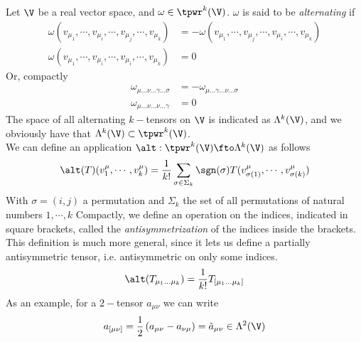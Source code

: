 \documentclass[../mmf.tex]{subfiles}
\begin{document}
\begin{dfn}
	Let $\V$ be a real vector space, and $\omega\in\tpwr^k(\V)$. $\omega$ is said to be \textit{alternating} if
	\begin{equation}
		\begin{aligned}
			\omega(v_{\mu_1},\cdots,v_{\mu_i},\cdots,v_{\mu_j},\cdots,v_{\mu_k})&=-\omega(v_{\mu_1},\cdots,v_{\mu_j},\cdots,v_{\mu_i},\cdots,v_{\mu_k})\\
			\omega(v_{\mu_1},\cdots,v_{\mu_i},\cdots,v_{\mu_i},\cdots,v_{\mu_k})&=0
		\end{aligned}
		\label{eq:alternatingtensor}
	\end{equation}
	Or, compactly
	\begin{equation}
		\begin{aligned}
			\omega_{\mu\ldots\nu\ldots\gamma\ldots\sigma}&=-\omega_{\mu\ldots\gamma\ldots\nu\ldots\sigma}\\
			\omega_{\mu\ldots\nu\ldots\nu\ldots\gamma}&=0
		\end{aligned}
		\label{eq:alttensein}
	\end{equation}
	The space of all alternating $k-$tensors on $\V$ is indicated as $\Lambda^k(\V)$, and we obviously have that $\Lambda^k(\V)\subset\tpwr^k(\V)$.\\
	We can define an application $\alt:\tpwr^k(\V)\fto\Lambda^k(\V)$ as follows
	\begin{equation}
		\alt(T)(v^\mu_1,\cdots,v^\mu_k)=\frac{1}{k!}\sum_{\sigma\in\Sigma_k}\sgn(\sigma)T(v^\mu_{\sigma(1)},\cdots,v^\mu_{\sigma(k)})
		\label{eq:alternating}
	\end{equation}
	With $\sigma=(i,j)$ a permutation and $\Sigma_k$ the set of all permutations of natural numbers $1,\cdots,k$
	Compactly, we define an operation on the indices, indicated in square brackets, called the \textit{antisymmetrization} of the indices inside the brackets.\\
	This definition is much more general, since it lets us define a partially antisymmetric tensor, i.e. antisymmetric on only some indices.
	\begin{equation}
		\alt(T_{\mu_1\ldots\mu_k})=\frac{1}{k!}T_{[\mu_1\ldots\mu_k]}
		\label{eq:antisymmbra}
	\end{equation}
	As an example, for a $2-$tensor $a_{\mu\nu}$ we can write
	\begin{equation}
		a_{[\mu\nu]}=\frac{1}{2}\left( a_{\mu\nu}-a_{\nu\mu} \right)=\tilde{a}_{\mu\nu}\in\Lambda^2(\V)
		\label{eq:2tensorantisymmbra}
	\end{equation}

\end{dfn}
\end{document}
